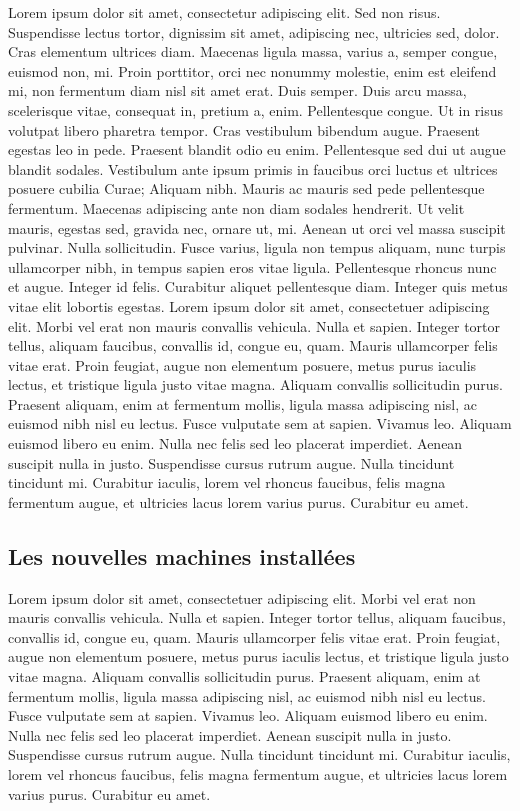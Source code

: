 Lorem ipsum dolor sit amet, consectetur adipiscing elit. Sed non risus. Suspendisse lectus tortor, dignissim sit amet, adipiscing nec, ultricies sed, dolor. Cras elementum ultrices diam. Maecenas ligula massa, varius a, semper congue, euismod non, mi. Proin porttitor, orci nec nonummy molestie, enim est eleifend mi, non fermentum diam nisl sit amet erat. Duis semper. Duis arcu massa, scelerisque vitae, consequat in, pretium a, enim. Pellentesque congue. Ut in risus volutpat libero pharetra tempor. Cras vestibulum bibendum augue. Praesent egestas leo in pede. Praesent blandit odio eu enim. Pellentesque sed dui ut augue blandit sodales. Vestibulum ante ipsum primis in faucibus orci luctus et ultrices posuere cubilia Curae; Aliquam nibh. Mauris ac mauris sed pede pellentesque fermentum. Maecenas adipiscing ante non diam sodales hendrerit. Ut velit mauris, egestas sed, gravida nec, ornare ut, mi. Aenean ut orci vel massa suscipit pulvinar. Nulla sollicitudin. Fusce varius, ligula non tempus aliquam, nunc turpis ullamcorper nibh, in tempus sapien eros vitae ligula. Pellentesque rhoncus nunc et augue. Integer id felis. Curabitur aliquet pellentesque diam. Integer quis metus vitae elit lobortis egestas. Lorem ipsum dolor sit amet, consectetuer adipiscing elit. Morbi vel erat non mauris convallis vehicula. Nulla et sapien. Integer tortor tellus, aliquam faucibus, convallis id, congue eu, quam. Mauris ullamcorper felis vitae erat. Proin feugiat, augue non elementum posuere, metus purus iaculis lectus, et tristique ligula justo vitae magna. Aliquam convallis sollicitudin purus. Praesent aliquam, enim at fermentum mollis, ligula massa adipiscing nisl, ac euismod nibh nisl eu lectus. Fusce vulputate sem at sapien. Vivamus leo. Aliquam euismod libero eu enim. Nulla nec felis sed leo placerat imperdiet. Aenean suscipit nulla in justo. Suspendisse cursus rutrum augue. Nulla tincidunt tincidunt mi. Curabitur iaculis, lorem vel rhoncus faucibus, felis magna fermentum augue, et ultricies lacus lorem varius purus. Curabitur eu amet.

\subsection{Les nouvelles machines installées}
Lorem ipsum dolor sit amet, consectetuer adipiscing elit. Morbi vel erat non mauris convallis vehicula. Nulla et sapien. Integer tortor tellus, aliquam faucibus, convallis id, congue eu, quam. Mauris ullamcorper felis vitae erat. Proin feugiat, augue non elementum posuere, metus purus iaculis lectus, et tristique ligula justo vitae magna. Aliquam convallis sollicitudin purus. Praesent aliquam, enim at fermentum mollis, ligula massa adipiscing nisl, ac euismod nibh nisl eu lectus. Fusce vulputate sem at sapien. Vivamus leo. Aliquam euismod libero eu enim. Nulla nec felis sed leo placerat imperdiet. Aenean suscipit nulla in justo. Suspendisse cursus rutrum augue. Nulla tincidunt tincidunt mi. Curabitur iaculis, lorem vel rhoncus faucibus, felis magna fermentum augue, et ultricies lacus lorem varius purus. Curabitur eu amet.

